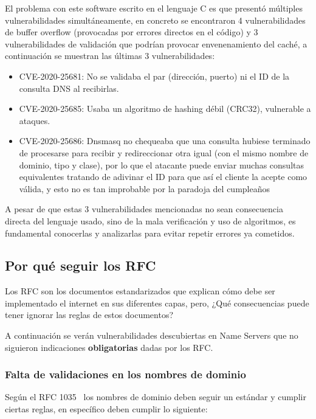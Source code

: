 El problema con este software escrito en el lenguaje C es que presentó múltiples vulnerabilidades simultáneamente, en concreto se encontraron 4 
vulnerabilidades de buffer overflow (provocadas por errores directos en el código) y 3 vulnerabilidades de validación que podrían provocar 
envenenamiento del caché, a continuación se muestran las últimas 3 vulnerabilidades:

\begin{itemize}
\item CVE-2020-25681: No se validaba el par (dirección, puerto) ni el ID de la consulta DNS al recibirlas.
\item CVE-2020-25685: Usaba un algoritmo de hashing débil (CRC32), vulnerable a ataques.
\item CVE-2020-25686: Dnsmasq no chequeaba que una consulta hubiese terminado de procesarse para recibir y redireccionar otra igual 
(con el mismo nombre de dominio, tipo y clase), por lo que el atacante puede enviar muchas consultas equivalentes tratando de adivinar el ID 
para que así el cliente la acepte como válida, y esto no es tan improbable por la paradoja del cumpleaños ~\cite{BirthdayAttacks}
\end{itemize}


A pesar de que estas 3 vulnerabilidades mencionadas no sean consecuencia directa del lenguaje usado, sino de la mala verificación y uso de 
algoritmos, es fundamental conocerlas y analizarlas para evitar repetir errores ya cometidos.

\subsection{Por qué seguir los RFC}

Los RFC son los documentos estandarizados que explican cómo debe ser implementado el internet en sus diferentes capas, pero, 
¿Qué consecuencias puede tener ignorar las reglas de estos documentos?

A continuación se verán vulnerabilidades descubiertas en Name Servers que no siguieron indicaciones \textbf{obligatorias} dadas por los RFC.

\subsubsection{Falta de validaciones en los nombres de dominio}

Según el RFC 1035~\cite{RFC1035} los nombres de dominio deben seguir un estándar y cumplir ciertas reglas, en específico deben cumplir lo siguiente:

